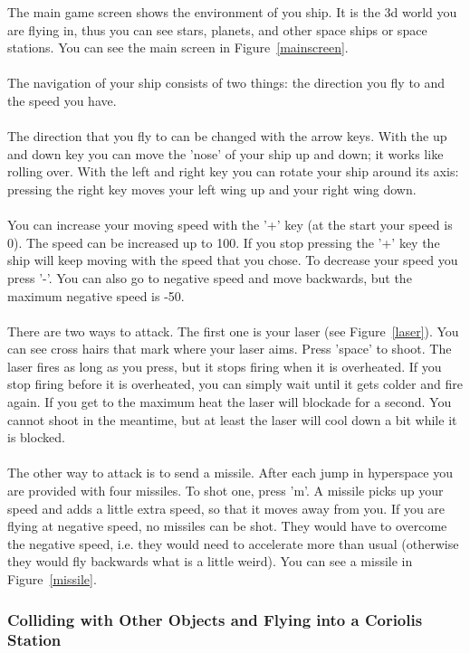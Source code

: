\documentclass[a4paper,11pt]{article}
\begin{document}
The main game screen shows the environment of you ship. It is the 3d world you are flying in, thus you can see stars, planets, and other space ships or space stations. You can see the main screen in Figure~\ref{mainscreen}.\\
\ \\
The navigation of your ship consists of two things: the direction you fly to and the speed you have. \\
\ \\
The direction that you fly to can be changed with the arrow keys. With the up and down key you can move the 'nose' of your ship up and down; it works like rolling over. 
With the left and right key you can rotate your ship around its axis: pressing the right key moves your left wing up and your right wing down. \\
\ \\
You can increase your moving speed with the '+' key (at the start your speed is 0). The speed can be increased up to 100. If you stop pressing the '+' key the ship will keep moving with the speed that you chose.
To decrease your speed you press '-'. You can also go to negative speed and move backwards, but the maximum negative speed is -50.\\
\ \\
There are two ways to attack. The first one is your laser (see Figure~\ref{laser}). You can see cross hairs that mark where your laser aims. Press 'space' to shoot. The laser fires as long as you press, but it stops firing when it is overheated. If you stop firing before it is overheated, you can simply wait until it gets colder and fire again. If you get to the maximum heat the laser will blockade for a second. You cannot shoot in the meantime, but at least the laser will cool down a bit while it is blocked.\\
\ \\
The other way to attack is to send a missile. After each jump in hyperspace you are provided with four missiles. To shot one, press 'm'. A missile picks up your speed and adds a little extra speed, so that it moves away from you. If you are flying at negative speed, no missiles can be shot. They would have to overcome the negative speed, i.e. they would need to accelerate more than usual (otherwise they would fly backwards what is a little weird). You can see a missile in Figure~\ref{missile}.

\subsubsection{Colliding with Other Objects and Flying into a Coriolis Station}
\end{document}
